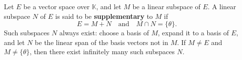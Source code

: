 Let $E$ be a vector space over $\mathbb{K}$, and let $M$ be a linear subspace of $E$. A linear subspace $N$ of $E$ is said to be \textbf{supplementary} to $M$ if
$$E = M + N \quad\text{and}\quad M \cap N = \{\theta\}.$$
Such subspaces $N$ always exist: choose a basis of $M$, expand it to a basis of $E$, and let $N$ be the linear span of the basis vectors not in $M$. If $M \neq E$ and $M \neq \{\theta\}$, then there exist infinitely many such subspaces $N$.
